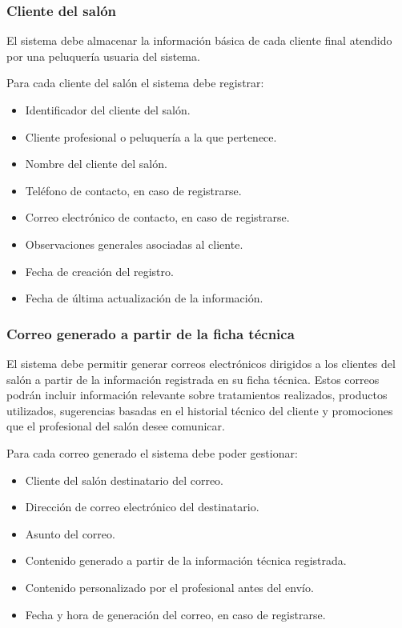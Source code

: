 \subsubsection*{Cliente del salón}

El sistema debe almacenar la información básica de cada cliente final atendido por una peluquería usuaria del sistema.

Para cada cliente del salón el sistema debe registrar:

\begin{itemize}
    \item Identificador del cliente del salón.
    \item Cliente profesional o peluquería a la que pertenece.
    \item Nombre del cliente del salón.
    \item Teléfono de contacto, en caso de registrarse.
    \item Correo electrónico de contacto, en caso de registrarse.
    \item Observaciones generales asociadas al cliente.
    \item Fecha de creación del registro.
    \item Fecha de última actualización de la información.
\end{itemize}

\subsubsection*{Correo generado a partir de la ficha técnica}

El sistema debe permitir generar correos electrónicos dirigidos a los clientes del salón a partir de la información registrada en su ficha técnica. Estos correos podrán incluir información relevante sobre tratamientos realizados, productos utilizados, sugerencias basadas en el historial técnico del cliente y promociones que el profesional del salón desee comunicar.

Para cada correo generado el sistema debe poder gestionar:

\begin{itemize}
    \item Cliente del salón destinatario del correo.
    \item Dirección de correo electrónico del destinatario.
    \item Asunto del correo.
    \item Contenido generado a partir de la información técnica registrada.
    \item Contenido personalizado por el profesional antes del envío.
    \item Fecha y hora de generación del correo, en caso de registrarse.
\end{itemize}

